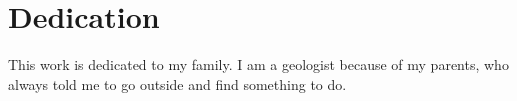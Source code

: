\chapter*{Dedication}
\begin{center}
This work is dedicated to my family. I am a geologist because of my parents, who always told me to go outside and find something to do.
\end{center}
